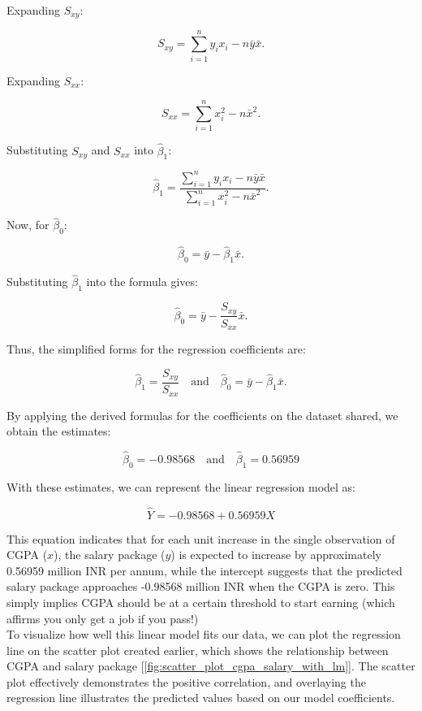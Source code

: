 Expanding \(S_{xy}\):

\[
S_{xy} = \sum_{i=1}^{n} y_i x_i - n\bar{y}\bar{x}.
\]

Expanding \(S_{xx}\):

\[
S_{xx} = \sum_{i=1}^{n} x_i^2 - n\bar{x}^2.
\]

Substituting \(S_{xy}\) and \(S_{xx}\) into \(\hat{\beta}_1\):

\[
\hat{\beta}_1 = \frac{\sum_{i=1}^{n} y_i x_i - n\bar{y}\bar{x}}{\sum_{i=1}^{n} x_i^2 - n\bar{x}^2}.
\]

Now, for \(\hat{\beta}_0\):

\[
\hat{\beta}_0 = \bar{y} - \hat{\beta}_1 \bar{x}.
\]

Substituting \(\hat{\beta}_1\) into the formula gives:

\[
\hat{\beta}_0 = \bar{y} - \frac{S_{xy}}{S_{xx}} \bar{x}.
\]

Thus, the simplified forms for the regression coefficients are:

\[
\hat{\beta}_1 = \frac{S_{xy}}{S_{xx}} \quad \text{and} \quad \hat{\beta}_0 = \bar{y} - \hat{\beta}_1 \bar{x}.
\]

\vspace{12pt}
By applying the derived formulas for the coefficients on the dataset shared, we obtain the estimates:

\[
\hat{\beta}_0 = -0.98568 \quad \text{and} \quad \hat{\beta}_1 = 0.56959
\]

With these estimates, we can represent the linear regression model as:

\[
\hat{Y} = -0.98568 + 0.56959 X
\]

This equation indicates that for each unit increase in the single observation of CGPA (\(x\)), the salary package (\(y\)) is expected to increase by approximately 0.56959 million INR per annum, while the intercept suggests that the predicted salary package approaches -0.98568 million INR when the CGPA is zero. This simply implies CGPA should be at a certain threshold to start earning (which affirms you only get a job if you pass!) \\

To visualize how well this linear model fits our data, we can plot the regression line on the scatter plot created earlier, which shows the relationship between CGPA and salary package [\ref{fig:scatter_plot_cgpa_salary_with_lm}]. The scatter plot effectively demonstrates the positive correlation, and overlaying the regression line illustrates the predicted values based on our model coefficients. 

